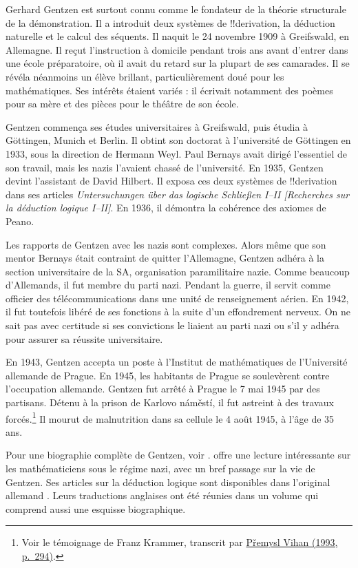 \documentclass[../../../include/open-logic-section]{subfiles}
\begin{document}



Gerhard Gentzen
est surtout connu
comme le fondateur
de la théorie
structurale de
la démonstration.
Il a introduit deux systèmes de !!{derivation},
la déduction naturelle et le calcul des séquents.
Il naquit le
24 novembre 1909
à Greifswald,
en Allemagne.
Il reçut
l'instruction
à domicile
pendant trois ans
avant d'entrer
dans une école
préparatoire,
où il avait
du retard
sur la plupart
de ses camarades.
Il se révéla
néanmoins un
élève brillant,
particulièrement
doué pour les
mathématiques.
Ses intérêts
étaient variés :
il écrivait
notamment des
poèmes pour
sa mère et
des pièces
pour le théâtre
de son école.

Gentzen commença
ses études
universitaires
à Greifswald,
puis étudia
à G\"{o}ttingen,
Munich et Berlin.
Il obtint
son doctorat
à l'université
de G\"{o}ttingen
en 1933,
sous la direction
de Hermann Weyl.
Paul Bernays
avait dirigé
l'essentiel
de son travail,
mais les nazis
l'avaient chassé
de l'université.
En 1935,
Gentzen devint
l'assistant
de David Hilbert.
Il exposa ces deux systèmes de !!{derivation}
dans ses articles
\emph{Untersuchungen
\"{u}ber das logische
Schlie\ss en I--II
[Recherches sur la
déduction logique
I--II]}.
En 1936,
il démontra
la cohérence
des axiomes
de Peano.

Les rapports
de Gentzen
avec les nazis
sont complexes.
Alors même
que son mentor
Bernays était
contraint de
quitter l'Allemagne,
Gentzen adhéra
à la section
universitaire
de la SA,
organisation
paramilitaire
nazie. Comme
beaucoup
d'Allemands,
il fut membre
du parti nazi.
Pendant la guerre,
il servit
comme officier
des télécommunications
dans une unité
de renseignement
aérien. En 1942,
il fut toutefois
libéré de ses
fonctions
à la suite
d'un effondrement
nerveux. On
ne sait pas
avec certitude
si ses convictions
le liaient
au parti nazi
ou s'il y
adhéra pour
assurer sa
réussite
universitaire.

En 1943,
Gentzen accepta
un poste
à l'Institut
de mathématiques
de l'Université
allemande
de Prague.
En 1945,
les habitants
de Prague
se soulevèrent
contre l'occupation
allemande.
Gentzen fut arrêté à Prague le 7 mai 1945 par des partisans.
Détenu à la prison de Karlovo náměstí, il fut astreint à des
travaux forcés.\footnote{Voir le témoignage de Franz Krammer,
transcrit par \href{https://dml.cz/dmlcz/139113}{Přemysl Vihan
(1993, p.~294)}.}
Il mourut
de malnutrition
dans sa cellule
le 4 août 1945,
à l'âge
de 35 ans.

\begin{reading}
Pour une biographie
complète de Gentzen,
voir
\citet{Menzler-Trott2007}.
\citet{Segal2014}
offre une lecture
intéressante sur
les mathématiciens
sous le régime
nazi, avec
un bref passage
sur la vie
de Gentzen.
Ses articles
sur la déduction
logique sont
disponibles
dans l'original
allemand
\citep{Gentzen1935a,Gentzen1935b}.
Leurs traductions
anglaises ont été
réunies dans un
volume
\citet{Gentzen1969}
qui comprend
aussi une
esquisse
biographique.
\end{reading}
\end{document}
